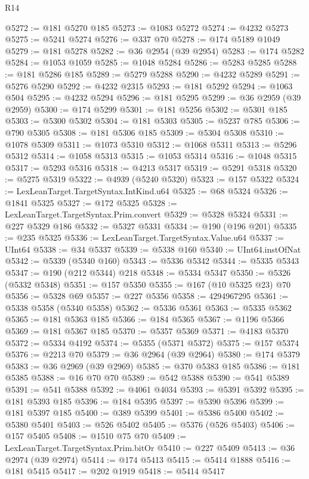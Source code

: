 \begin{lexlean}{R14}
\begin{coremodule}
@5272 := @181 @5270 @185
@5273 := @1083 @5272
@5274 := @4232 @5273
@5275 := @5241 @5274
@5276 := @337 @70
@5278 := @174 @5189 @1049
@5279 := @181 @5278
@5282 := @36 @2954 (@39 @2954)
@5283 := @174 @5282
@5284 := @1053 @1059
@5285 := @1048 @5284
@5286 := @5283 @5285
@5288 := @181 @5286 @185
@5289 := @5279 @5288
@5290 := @4232 @5289
@5291 := @5276 @5290
@5292 := @4232 @2315
@5293 := @181 @5292
@5294 := @1063 @504
@5295 := @4232 @5294
@5296 := @181 @5295
@5299 := @36 @2959 (@39 @2959)
@5300 := @174 @5299
@5301 := @181 @5256
@5302 := @5301 @185
@5303 := @5300 @5302
@5304 := @181 @5303
@5305 := @5237 @785
@5306 := @790 @5305
@5308 := @181 @5306 @185
@5309 := @5304 @5308
@5310 := @1078 @5309
@5311 := @1073 @5310
@5312 := @1068 @5311
@5313 := @5296 @5312
@5314 := @1058 @5313
@5315 := @1053 @5314
@5316 := @1048 @5315
@5317 := @5293 @5316
@5318 := @4213 @5317
@5319 := @5291 @5318
@5320 := @5275 @5319
@5322 := @4939 (@5240 @5320)
@5323 := @157 @5322
@5324 := LexLeanTarget.TargetSyntax.IntKind.u64
@5325 := @68 @5324
@5326 := @1841 @5325
@5327 := @172 @5325
@5328 := LexLeanTarget.TargetSyntax.Prim.convert
@5329 := @5328 @5324
@5331 := @227 @5329 @186
@5332 := @5327 @5331
@5334 := @190 (@196 @201)
@5335 := @235 @5325
@5336 := LexLeanTarget.TargetSyntax.Value.u64
@5337 := UInt64
@5338 := @34 @5337
@5339 := @5338 @160
@5340 := UInt64.instOfNat
@5342 := @5339 (@5340 @160)
@5343 := @5336 @5342
@5344 := @5335 @5343
@5347 := @190 (@212 @5344) @218
@5348 := @5334 @5347
@5350 := @5326 (@5332 @5348)
@5351 := @157 @5350
@5355 := @167 (@10 @5325 @23) @70
@5356 := @5328 @69
@5357 := @227 @5356
@5358 := 4294967295
@5361 := @5338 @5358 (@5340 @5358)
@5362 := @5336 @5361
@5363 := @5335 @5362
@5365 := @181 @5363 @185
@5366 := @184 @5365
@5367 := @1196 @5366
@5369 := @181 @5367 @185
@5370 := @5357 @5369
@5371 := @4183 @5370
@5372 := @5334 @4192
@5374 := @5355 (@5371 @5372)
@5375 := @157 @5374
@5376 := @2213 @70
@5379 := @36 @2964 (@39 @2964)
@5380 := @174 @5379
@5383 := @36 @2969 (@39 @2969)
@5385 := @370 @5383 @185
@5386 := @181 @5385
@5388 := @16 @70 @70
@5389 := @542 @5388
@5390 := @541 @5389
@5391 := @541 @5388
@5392 := @4061 @4034
@5393 := @5391 @5392
@5395 := @181 @5393 @185
@5396 := @184 @5395
@5397 := @5390 @5396
@5399 := @181 @5397 @185
@5400 := @389 @5399
@5401 := @5386 @5400
@5402 := @5380 @5401
@5403 := @526 @5402
@5405 := @5376 (@526 @5403)
@5406 := @157 @5405
@5408 := @1510 @75 @70
@5409 := LexLeanTarget.TargetSyntax.Prim.bitOr
@5410 := @227 @5409
@5413 := @36 @2974 (@39 @2974)
@5414 := @174 @5413
@5415 := @5414 @1888
@5416 := @181 @5415
@5417 := @202 @1919
@5418 := @5414 @5417

\end{coremodule}
\end{lexlean}
